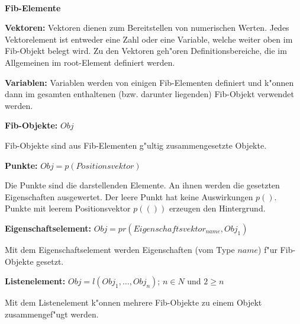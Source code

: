 \documentclass[10pt,a4paper]{article}
\begin{document}





\ \vspace{-2.5cm}
\begin{center}
	\LARGE\bf Fib-Elemente
\end{center}

\bigskip\noindent
\textbf{Vektoren:} Vektoren dienen zum Bereitstellen von numerischen Werten. Jedes Vektorelement ist entweder eine Zahl oder eine Variable, welche weiter oben im Fib-Objekt belegt wird. Zu den Vektoren geh"oren Definitionsbereiche, die im Allgemeinen im root-Element definiert werden.

\bigskip\noindent
\textbf{Variablen:} Variablen werden von einigen Fib-Elementen definiert und k"onnen dann im gesamten enthaltenen (bzw. darunter liegenden) Fib-Objekt verwendet werden.

\bigskip\noindent
\textbf{Fib-Objekte:} $Obj$

Fib-Objekte sind aus Fib-Elementen g"ultig zusammengesetzte Objekte.

\bigskip\noindent
\textbf{Punkte:} $Obj = p( Positionsvektor )$

Die Punkte sind die darstellenden Elemente. An ihnen werden die gesetzten Eigenschaften ausgewertet. Der leere Punkt hat keine Auswirkungen $p()$. Punkte mit leerem Positionsvektor $p(())$ erzeugen den Hintergrund.

\bigskip\noindent
\textbf{Eigenschaftselement:} $Obj = pr( Eigenschaftsvektor_{name}, Obj_1 )$

Mit dem Eigenschaftselement werden Eigenschaften (vom Type $name$) f"ur Fib-Objekte gesetzt.

\bigskip\noindent
\textbf{Listenelement:} $Obj = l( Obj_1, \ldots, Obj_n )$; $n \in N$ und $2 \geq n$

Mit dem Listenelement k"onnen mehrere Fib-Objekte zu einem Objekt zusammengef"ugt werden.
\end{document}
